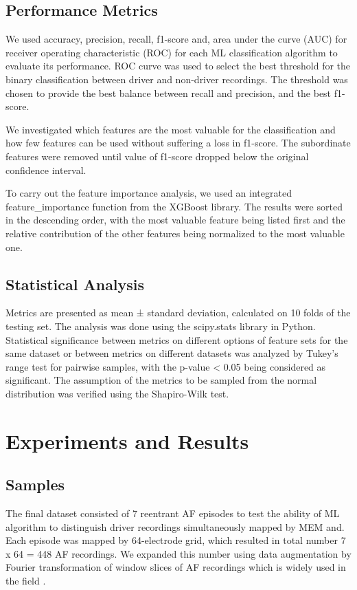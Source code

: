 \documentclass{article}
\begin{document}
\subsection{Performance Metrics}

We used accuracy, precision, recall, f1-score and, area under the curve (AUC) for receiver operating characteristic (ROC) for each ML classification algorithm to evaluate its performance. ROC curve was used to select the best threshold for the binary classification between driver and non-driver recordings. The threshold was chosen to provide the best balance between recall and precision, and the best f1-score.

We investigated which features are the most valuable for the classification and how few features can be used without suffering a loss in f1-score. The subordinate features were removed until value of f1-score dropped below the original confidence interval. 

To carry out the feature importance analysis, we used an integrated feature\_importance function from the XGBoost library. The results were sorted in the descending order, with the most valuable feature being listed first and the relative contribution of the other features being normalized to the most valuable one.

\subsection{Statistical Analysis}
Metrics are presented as mean ± standard deviation, calculated on 10 folds of the testing set. The analysis was done using the scipy.stats library in Python. Statistical significance between metrics on different options of feature sets for the same dataset or between metrics on different datasets was analyzed by Tukey’s range test for pairwise samples, with the p-value < 0.05 being considered as significant. The assumption of the metrics to be sampled from the normal distribution was verified using the Shapiro-Wilk test. 
\section{Experiments and Results}
\label{submission}

\subsection{Samples}
The final dataset consisted of 7 reentrant AF episodes to test the ability of ML algorithm to distinguish driver recordings simultaneously mapped by MEM and. Each episode was mapped by 64-electrode grid, which resulted in total number 7 x 64 = 448 AF recordings. We expanded this number using data augmentation by Fourier transformation of window slices of AF recordings which is widely used in the field \cite{Cui2016, LeGuennec2016}. 
\end{document}
